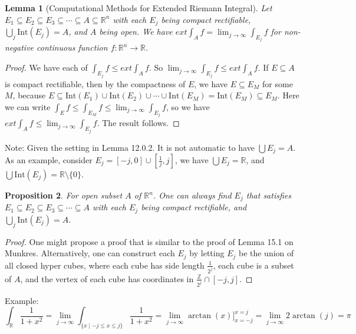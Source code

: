 \documentclass[11pt,oneside]{book}
\theoremstyle{break}
\theoremstyle{break}
\newtheorem{lem}{Lemma}[thm]
\newtheorem{prop}[lem]{Proposition}
\newcommand{\R}{\mathbb{R}}
\newcommand{\Z}{\mathbb{Z}}
\newcommand{\Int}{\text{Int}}
\newcommand{\note}{\color{red}Note: \color{black}}
\newcommand{\example}{\color{green}Example: \color{black}}
\begin{document}
\begin{lem}[Computational Methods for Extended Riemann Integral]
Let $E_1\subseteq E_2\subseteq E_3\subseteq \cdots \subseteq A\subseteq \R^n$ with each $E_j$ being compact rectifiable, $\bigcup_j \Int(E_j) = A$, and $A$ being open. We have $ext \int_A f = \lim_{j \to \infty} \int_{E_j} f$ for non-negative continuous function $f:\R^n \to \R$. 
\end{lem}
\begin{proof}
We have each of $\int_{E_j} f \leq ext\int_A f$. So $\lim_{j\to \infty} \int_{E_j} f \leq ext \int_A f$. If $E\subseteq A$ is compact rectifiable, then by the compactness of $E$, we have $E\subseteq E_M$ for some $M$, because $E\subseteq \Int (E_1) \cup \Int(E_2) \cup \cdots \cup \Int(E_M) = \Int (E_M) \subseteq E_M$. Here we can write $\int_E f \leq \int_{E_M} f \leq \lim_{j \to \infty} \int_{E_j} f$, so we have $ext \int_A f \leq \lim_{j \to \infty} \int_{E_j} f$. The result follows.
\end{proof}
\note Given the setting in Lemma 12.0.2. It is not automatic to have $\bigcup E_j = A$. As an example, consider $E_j = [-j,0] \cup [\frac{1}{j},j]$, we have $\bigcup E_j = \R$, and $\bigcup \Int(E_j) = \R\setminus \{0\}$. 

\begin{prop}
For open subset $A$ of $\R^n$. One can always find $E_j$ that satisfies $E_1\subseteq E_2\subseteq E_3\subseteq \cdots \subseteq A$ with each $E_j$ being compact rectifiable, and $\bigcup_j \Int(E_j) = A$.
\end{prop}
\begin{proof}
One might propose a proof that is similar to the proof of Lemma 15.1 on Munkres. Alternatively, one can construct each $E_j$ by letting $E_j$ be the union of all closed hyper cubes, where each cube has side length $\frac{1}{2^{j}}$, each cube is a subset of $A$, and the vertex of each cube has coordinates in $\frac{\Z}{2^j} \cap [-j, j]$.
\end{proof}

\hfill\break
\example $$\int_\R \frac{1}{1+x^2} = \lim_{j \to \infty} \int_{\{x \mid -j \leq x \leq j\}}\frac{1}{1+x^2} = \lim_{j\to \infty} \arctan(x)]_{x=-j}^{x=j} = \lim_{j \to \infty} 2\arctan(j) = \pi$$

\newpage
\end{document}
